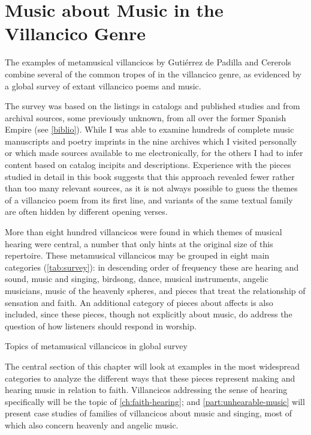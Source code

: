 \section{Music about Music in the Villancico Genre}

The examples of metamusical villancicos by Gutiérrez de Padilla and Cererols
combine several of the common tropes of  in the
villancico genre, as evidenced by a global survey of extant villancico poems
and music.%
\begin{Footnote}
    The survey was based on the listings in catalogs and published studies and
    from archival sources, some previously unknown, from all over the former
    Spanish Empire (see \cref{biblio}).
    While I was able to examine hundreds of complete music manuscripts and
    poetry imprints in the nine archives which I visited personally or which
    made sources available to me electronically, for the others I had to infer
    content based on catalog incipits and descriptions.
    Experience with the pieces studied in detail in this book suggests that
    this approach revealed fewer rather than too many relevant sources, as it
    is not always possible to guess the themes of a villancico poem from its
    first line, and variants of the same textual family are often hidden by
    different opening verses.
\end{Footnote}
More than eight hundred villancicos were found in which themes of musical
hearing were central, a number that only hints at the original size of this
repertoire.
These metamusical villancicos may be grouped in eight main categories
(\cref{tab:survey}): in descending order of frequency these are hearing and
sound, music and singing, birdsong, dance, musical instruments, angelic
musicians, music of the heavenly spheres, and pieces that treat the
relationship of sensation and faith.
An additional category of pieces about affects is also included, since these
pieces, though not explicitly about music, do address the question of how
listeners should respond in worship. 

{Topics of metamusical villancicos in global survey}

The central section of this chapter will look at examples in the most
widespread categories to analyze the different ways that these pieces represent
making and hearing music in relation to faith.
Villancicos addressing the sense of hearing specifically will be the topic of
\cref{ch:faith-hearing}; and \cref{part:unhearable-music} will present case
studies of families of villancicos about music and singing, most of which also
concern heavenly and angelic music.

